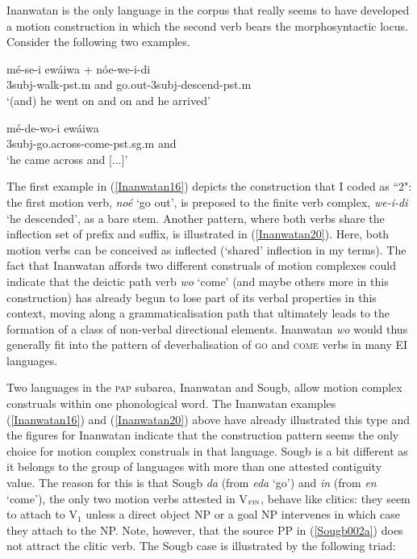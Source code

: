 Inanwatan is the only language in the corpus that really seems to have developed a motion construction in which the second verb bears the morphosyntactic locus. Consider the following two examples.

\ea \label{Inanwatan16}
\gll mé-se-i ewáiwa + nóe-we-i-di \\
\acs{3}\acs{subj}-walk-\acs{pst}.\acs{m} and go.out-\acs{3}\acs{subj}-descend-\acs{pst}.\acs{m} \\
\glft `(and) he went on and on and he arrived' \\ 
\z
\xe

\ea \label{Inanwatan20}
\gll mé-de-wo-i ewáiwa \\
\acs{3}\acs{subj}-go.across-come-\acs{pst}.\acs{sg}.\acs{m} and \\
\glft `he came across and [...]' \\ 
\z
\xe

The first example in (\ref{Inanwatan16}) depicts the construction that I coded as ``2": the first motion verb, \textit{noé} `go out', is preposed to the finite verb complex, \textit{we-i-di} `he descended', as a bare stem. Another pattern, where both verbs share the inflection set of prefix and suffix, is illustrated in (\ref{Inanwatan20}). Here, both motion verbs can be conceived as inflected (`shared' inflection in my terms). The fact that Inanwatan affords two different construals of motion complexes could indicate that the deictic path verb \textit{wo} `come' (and maybe others more in this construction) has already begun to lose part of its verbal properties in this context, moving along a grammaticalisation path that ultimately leads to the formation of a class of non-verbal directional elements. Inanwatan \textit{wo} would thus generally fit into the pattern of deverbalisation of \textsc{go} and \textsc{come} verbs in many EI languages.

Two languages in the \textsc{pap} subarea, Inanwatan and Sougb, allow motion complex construals within one phonological word. The Inanwatan examples (\ref{Inanwatan16}) and (\ref{Inanwatan20}) above have already illustrated this type and the figures for Inanwatan indicate that the construction pattern seems the only choice for motion complex construals in that language. Sougb is a bit different as it belongs to the group of languages with more than one attested contiguity value. The reason for this is that Sougb \textit{da} (from \textit{eda} `go') and \textit{in} (from \textit{en} `come'), the only two motion verbs attested in V$_{\textsc{fin}}$, behave like clitics: they seem to attach to V$_{1}$ unless a direct object NP or a goal NP intervenes in which case they attach to the NP. Note, however, that the source PP in (\ref{Sougb002a}) does not attract the clitic verb. The Sougb case is illustrated by the following triad:

